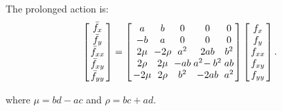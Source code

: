\documentclass[review,onefignum,onetabnum]{siamonline190516}
\begin{document}
{The prolonged action is:
\begin{equation}
\arraycolsep=1.4pt
\left[
\begin{array}{c}
  \bar f_x \\ \bar f_y \\ \bar f_{xx} \\ \bar f_{xy} \\ \bar f_{yy} 
 \end{array}
 \right]
 = 
\left[
\begin{array}{ccccc}
 a & b & 0 & 0 & 0 \\
 -b & a & 0 & 0 & 0 \\
 2\mu & -2 \rho & a^2 & 2 a b & b^2 \\
 2 \rho & 2\mu & -a b & a^2\!-b^2 & a b \\
 -2\mu & 2 \rho & b^2 & -2 a b & a^2 \\
\end{array}
\right]\left[
\begin{array}{c}
f_x \\ f_y \\ f_{xx} \\ f_{xy} \\ f_{yy} \\
 \end{array}
 \right].
\label{eqn:mobius}
 \end{equation}

\noindent where $\mu = b d - a c$ and $\rho = b c + a d$.

}
\end{document}
